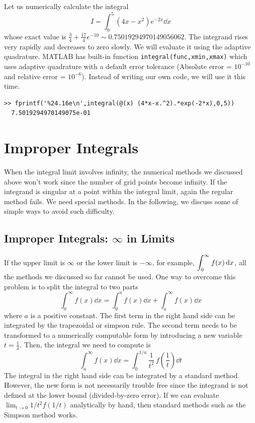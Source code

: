\begin{example}
Let us numerically calculate the integral
\[
I=\int_0^5 (4x-x^2) e^{-2x} \dd{x}
\]
whose exact value is $\displaystyle\frac{3}{4} + \frac{17}{4} e^{-10}\sim 0.75019294970149056062$.  The integrand rises very rapidly and decreases to zero slowly.  We will evaluate it using the adaptive quadrature.
MATLAB has built-in function \texttt{integral(func,xmin,xmax)} which uses adaptive quadrature with a default error tolerance (Absolute error = $10^{-10}$ and relative error = $10^{-6}$).  Instead of writing our own code, we will use it this time.
\begin{mybox}
\small
\begin{verbatim}
>> fprintf('%24.16e\n',integral(@(x) (4*x-x.^2).*exp(-2*x),0,5))
  7.5019294970149075e-01
\end{verbatim}
\normalsize
\end{mybox}

\end{example}

\noindent
\section{Improper Integrals}

When the integral limit involves infinity, the numerical methods we discussed above won't work since the number of grid points become infinity.  If the integrand is singular at a point within the integral limit, again the regular method fails.  We need special methods.  In the following, we discuss some of simple ways to avoid such difficulty.

\noindent
\subsection{Improper Integrals: $\infty$ in Limits}

If the upper limit is $\infty$ or the lower limit is $-\infty$, for example, $\displaystyle\int_0^\infty f(x)\, \text{d} x$, all the methods we discussed so far cannot be used. One way to overcome this problem is to split the integral to two parts
\begin{equation}
\int_0^\infty f(x) \dd{x} = \int_0^a f(x) \dd{x} + \int_a^\infty f(x) \dd{x}
\end{equation}
where $a$ is a positive constant.
The first term in the right hand side can be integrated by the trapezoidal or simpson rule. The second term needs to be transformed to a numerically computable form by introducing a new variable $t=\displaystyle\frac{1}{x}$. Then, the integral we need to compute is
\begin{equation}
\int_a^\infty f(x) \dd{x} = \int_0^{1/a} \frac{1}{t^2}\, f\left (\frac{1}{t} \right ) \dd{t}
\end{equation}
The integral in the right hand side can be integrated by a standard method. However, the new form is not necessarily trouble free since the integrand is not defined at the lower bound (divided-by-zero error). If we can evaluate $\lim_{t \rightarrow 0} 1/t^2 f(1/t)$ analytically by hand, then standard methods such as the Simpson method works. 

